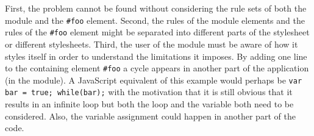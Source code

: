 \documentclass[a4paper,11pt]{kth-mag}
\newcommand{\code}[1]{\texttt{#1}}
\begin{document}
        First, the problem cannot be found without considering the rule sets of both the module and the \code{\#foo} element.
        Second, the rules of the module elements and the rules of the \code{\#foo} \gls{element} might be separated into different parts of the stylesheet or different stylesheets.
        Third, the user of the module must be aware of how it styles itself in order to understand the limitations it imposes.
        By adding one line to the containing element \code{\#foo} a cycle appears in another part of the application (in the module).
        A \gls{JavaScript} equivalent of this example would perhaps be \code{var bar = true; while(bar);} with the motivation that it is still obvious that it results in an infinite loop but both the loop and the variable both need to be considered.
        Also, the variable assignment could happen in another part of the code.
\end{document}
